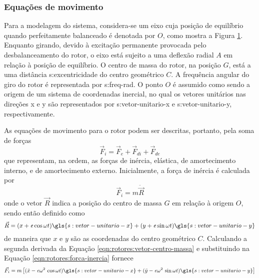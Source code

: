 \documentclass[12pt,oneside,english,brazil]{ucsmono}
\begin{document}
	\subsubsection{Equações de movimento}
	Para a modelagem do sistema, considera-se um eixo cuja posição de equilíbrio quando perfeitamente balanceado é denotada por $\!\mathit{O}$, como mostra a Figura \ref{fig:rotor-excentrico}. Enquanto girando, devido à excitação permanente provocada pelo desbalanceamento do rotor, o eixo está sujeito a uma deflexão radial $\!\mathit{A}$ em relação à posição de equilíbrio. O centro de massa do rotor, na posição $\!\mathit{G}$, está a uma distância \gls{s:excentricidade} do centro geométrico $\!\mathit{C}$. A frequência angular do giro do rotor é representada por \gls{s:freq-rad}. O ponto $\!\mathit{O}$ é assumido como sendo a origem de um sistema de coordenadas inercial, no qual os vetores unitários nas direções x e y são representados por \gls{s:vetor-unitario-x} e \gls{s:vetor-unitario-y}, respectivamente.
	\begin{figure}[h]
		\label{fig:rotor-excentrico}
	\end{figure}
	
	As equações de movimento para o rotor podem ser descritas, portanto, pela soma de forças \cite{rao:2008}
	\begin{equation} \label{eqn:rotores:forcas}
		\vec{F}_i = \vec{F}_e + \vec{F}_{di} + \vec{F}_{de}
	\end{equation}
	que representam, na ordem, as forças de inércia, elástica, de amortecimento interno, e de amortecimento externo. Inicialmente, a força de inércia é calculada por \cite{rao:2008}
	\begin{equation} \label{eqn:rotores:forca-inercia}
		\vec{F}_i = m\ddot{\vec{R}}
	\end{equation}
	onde o vetor $ \vec{R} $ indica a posição do centro de massa $ \mathit{G} $ em relação à origem $ \mathit{O} $, sendo então definido como \cite{rao:2008}
	\begin{equation} \label{eqn:rotores:vetor-centro-massa}
		\vec{R} = (x + \mathit{e}\cos\omega t)\gls{s:vetor-unitario-x} + (y + \mathit{e}\sin\omega t)\gls{s:vetor-unitario-y}
	\end{equation}
	de maneira que $ x $ e $ y $ são as coordenadas do centro geométrico $ \mathit{C} $. Calculando a segunda derivada da Equação \ref{eqn:rotores:vetor-centro-massa} e substituindo na Equação \ref{eqn:rotores:forca-inercia} fornece
	\begin{equation} \label{eqn:rotres:forca-inercia}
		\vec{F}_i = m\left[ (\ddot{x} - \mathit{e}\omega^2\,\cos\omega t)\gls{s:vetor-unitario-x} +
		(\ddot{y} - \mathit{e}\omega^2\,\sin\omega t)\gls{s:vetor-unitario-y} \right]
	\end{equation}
	
\end{document}
